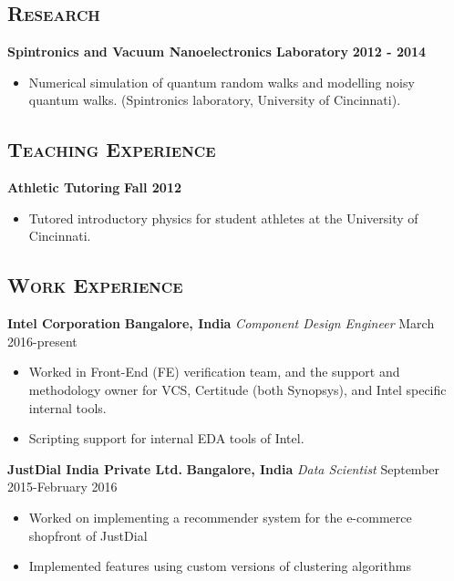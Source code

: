 \documentclass[10pt]{article}
\begin{document}

\subsection*{\textsc{\large Research}}
\textbf{Spintronics and Vacuum Nanoelectronics Laboratory} \hfill \textbf{2012 - 2014}
\begin{itemize}
\item Numerical simulation of quantum random walks and modelling noisy quantum walks. (Spintronics laboratory, University of Cincinnati).
\end{itemize}

\subsection*{\textsc{\large Teaching Experience}}
\textbf{Athletic Tutoring} \hfill \textbf{Fall 2012}
\begin{itemize}
\item Tutored introductory physics for student athletes at the University of Cincinnati.
\end{itemize}

\subsection*{\textsc{\large Work Experience}}
\textbf{Intel Corporation} \hfill \textbf{Bangalore, India} \newline
\textit{Component Design Engineer} \hfill March 2016-present
\begin{itemize}
\item Worked in Front-End (FE) verification team, and the support and methodology owner for VCS, Certitude (both Synopsys), and Intel specific internal tools.
\item Scripting support for internal EDA tools of Intel.
\end{itemize}

\textbf{JustDial India Private Ltd.} \hfill \textbf{Bangalore, India} \newline
\textit{Data Scientist} \hfill September 2015-February 2016
\begin{itemize}
\item Worked on implementing a recommender system for the e-commerce shopfront of JustDial
\item Implemented features using custom versions of clustering algorithms
\end{itemize}
\end{document}
